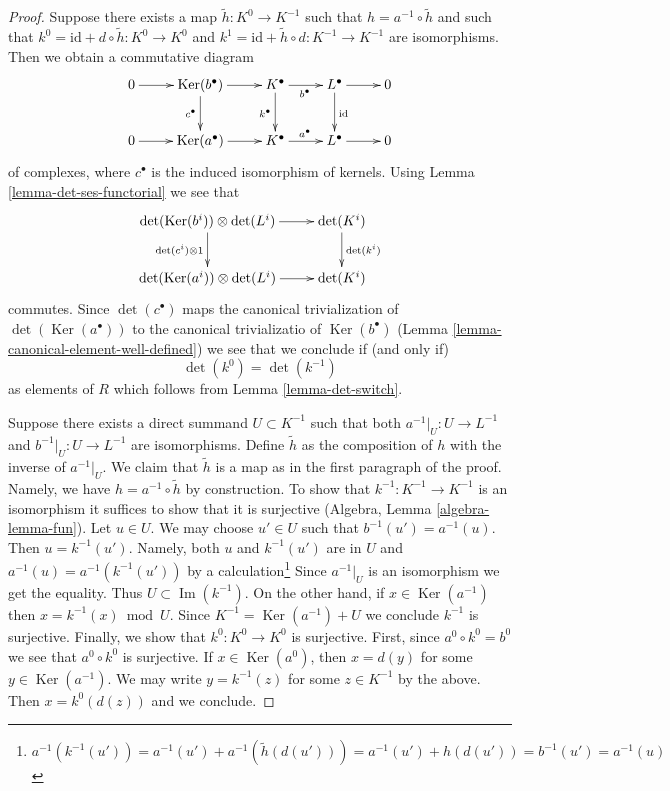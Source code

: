 \documentclass[10pt,a4paper]{amsart}
\theoremstyle{plain}
\theoremstyle{definition}
\theoremstyle{remark}
\numberwithin{equation}{subsection}
\def\Ker{\mathop{\mathrm{Ker}}}
\def\Im{\mathop{\mathrm{Im}}}
\begin{document}
\begin{proof}
Suppose there exists a map $\tilde h : K^0 \to K^{-1}$ such that
$h = a^{-1} \circ \tilde h$ and such that
$k^0 = \text{id} + d \circ \tilde h : K^0 \to K^0$ and
$k^1 = \text{id} + \tilde h \circ d : K^{-1} \to K^{-1}$ are isomorphisms.
Then we obtain a commutative diagram
$$
\xymatrix{
0 \ar[r] &
\Ker(b^\bullet) \ar[r] \ar[d]_{c^\bullet} &
K^\bullet \ar[r]_{b^\bullet}
\ar[d]_{k^\bullet} &
L^\bullet \ar[r] \ar[d]^{\text{id}} &
0 \\
0 \ar[r] &
\Ker(a^\bullet) \ar[r] &
K^\bullet \ar[r]^{a^\bullet} &
L^\bullet \ar[r] &
0
}
$$
of complexes, where $c^\bullet$ is the induced isomorphism of kernels.
Using Lemma \ref{lemma-det-ses-functorial} we see that
$$
\xymatrix{
\det(\Ker(b^i)) \otimes \det(L^i) \ar[r] \ar[d]_{\det(c^i) \otimes 1} &
\det(K^i) \ar[d]^{\det(k^i)} \\
\det(\Ker(a^i)) \otimes \det(L^i) \ar[r] &
\det(K^i)
}
$$
commutes. Since $\det(c^\bullet)$ maps the canonical trivialization
of $\det(\Ker(a^\bullet))$ to the canonical trivializatio of $\Ker(b^\bullet)$
(Lemma \ref{lemma-canonical-element-well-defined})
we see that we conclude if (and only if)
$$
\det(k^0) = \det(k^{-1})
$$
as elements of $R$ which follows from Lemma \ref{lemma-det-switch}.

\medskip\noindent
Suppose there exists a direct summand $U \subset K^{-1}$ such that both
$a^{-1}|_U : U \to L^{-1}$ and $b^{-1}|_U : U \to L^{-1}$
are isomorphisms. Define $\tilde h$ as the composition of $h$
with the inverse of $a^{-1}|_U$. We claim that $\tilde h$ is a
map as in the first paragraph of the proof. Namely, we have
$h = a^{-1} \circ \tilde h$ by construction. 
To show that $k^{-1} : K^{-1} \to K^{-1}$
is an isomorphism it suffices to show that it is surjective
(Algebra, Lemma \ref{algebra-lemma-fun}). Let $u \in U$. We may
choose $u' \in U$ such that $b^{-1}(u') = a^{-1}(u)$.
Then $u = k^{-1}(u')$. Namely, both $u$ and $k^{-1}(u')$
are in $U$ and $a^{-1}(u) = a^{-1}(k^{-1}(u'))$ by a
calculation\footnote{$a^{-1}(k^{-1}(u')) =
a^{-1}(u') + a^{-1}(\tilde h(d(u'))) =
a^{-1}(u') + h(d(u')) = b^{-1}(u') = a^{-1}(u)$} Since $a^{-1}|_U$
is an isomorphism we get the equality. Thus $U \subset \Im(k^{-1})$.
On the other hand, if $x \in \Ker(a^{-1})$ then
$x = k^{-1}(x) \bmod U$. Since $K^{-1} = \Ker(a^{-1}) + U$ we conclude
$k^{-1}$ is surjective.
Finally, we show that $k^0 : K^0 \to K^0$ is surjective.
First, since $a^0 \circ k^0 = b^0$ we see that $a^0 \circ k^0$ is
surjective. If $x \in \Ker(a^0)$, then $x = d(y)$ for some
$y \in \Ker(a^{-1})$. We may write $y = k^{-1}(z)$ for some $z \in K^{-1}$
by the above. Then $x = k^0(d(z))$ and we conclude.


\end{proof}
\end{document}
